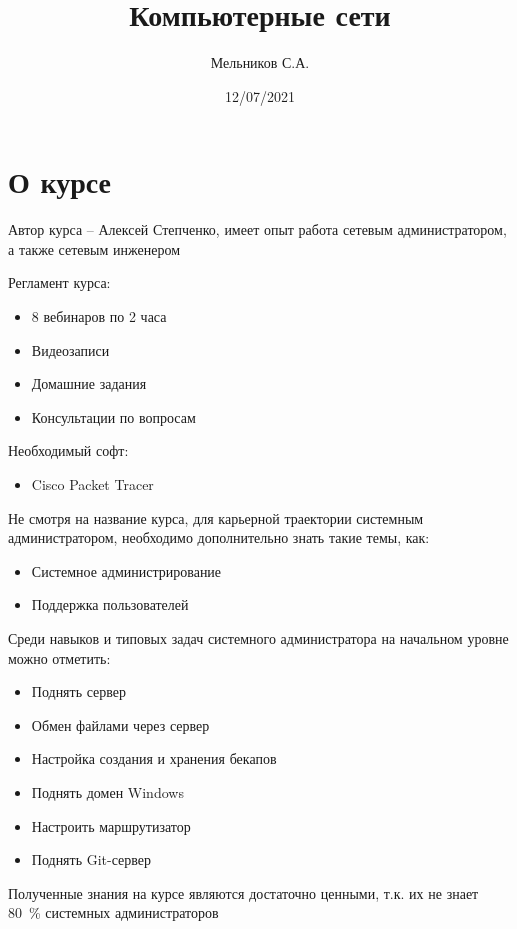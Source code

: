 \documentclass[a4paper]{article}
\title{Компьютерные сети}
\author{Мельников С.А.}
\date{12/07/2021}
\begin{document}
\maketitle
\tableofcontents
\newpage

\renewcommand{\labelenumii}{\theenumi.\arabic{enumii}}	\renewcommand{\labelenumiii}{\labelenumii.\arabic{enumiii}}

\section{О курсе}
Автор курса -- Алексей Степченко, имеет опыт работа сетевым администратором, а также сетевым инженером

Регламент курса:
\begin{itemize}
	\item 8 вебинаров по 2 часа 
	\item Видеозаписи
	\item Домашние задания
	\item Консультации по вопросам
\end{itemize}

Необходимый софт:
\begin{itemize}
	\item Cisco Packet Tracer
\end{itemize}

Не смотря на название курса, для карьерной траектории системным администратором, необходимо дополнительно знать такие темы, как:
\begin{itemize}
	\item Системное администрирование
	\item Поддержка пользователей
\end{itemize}

Среди навыков и типовых задач системного администратора на начальном уровне можно отметить: 
\begin{itemize}
	\item Поднять сервер
	\item Обмен файлами через сервер
	\item Настройка создания и хранения бекапов
	\item Поднять домен Windows
	\item Настроить маршрутизатор
	\item Поднять Git-сервер
\end{itemize}

Полученные знания на курсе являются достаточно ценными, т.к. их не знает 80~\% системных администраторов
\end{document}

